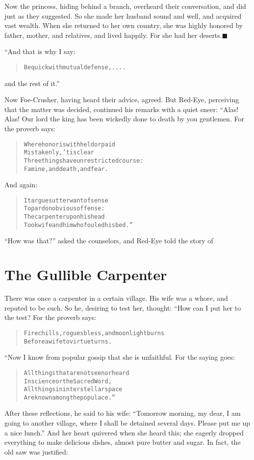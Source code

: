 \documentclass[article, twoside, 14pt]{memoir}
\newcommand{\qed}{\hfill \ensuremath{\blacksquare}}
\renewenvironment{verbatim}{%
\begin{quote}%
\vskip -10pt%
\begin{alltt}\normalfont\large}{\end{alltt}%
\end{quote}%
\vskip -10pt
} %
\begin{document}
Now the princess, hiding behind a branch, overheard their
conversation, and did just as they suggested. So she made her
husband sound and well, and acquired vast wealth. When she returned
to her own country, she was highly honored by father, mother, and
relatives, and lived happily. For she had her
deserts.\hyperref[s58]{\qed}

“And that is why I say:

\begin{verbatim}
Be quick with mutual defense, ....
\end{verbatim}
and the rest of it.”

Now Foe-Crusher, having heard their advice, agreed. But Red-Eye,
perceiving that the matter was decided, continued his remarks with
a quiet sneer: “Alas! Alas! Our lord the king has been wickedly
done to death by you gentlemen. For the proverb says:

\begin{verbatim}
Where honor is withheld or paid
    Mistakenly, 'tis clear
Three things have unrestricted course:
    Famine, and death, and fear.
\end{verbatim}
And again:

\begin{verbatim}
It argues utter want of sense
To pardon obvious offense:
The carpenter upon his head
Took wife and him who fouled his bed.”
\end{verbatim}
``How was that?'' asked the counselors, and Red-Eye told the story
of

\chapter{The Gullible Carpenter}

\label{s59}

There was once a carpenter in a certain village. His wife was
a whore, and reputed to be such. So he, desiring to test her,
thought: “How can I put her to the test? For the proverb says:

\begin{verbatim}
Fire chills, rogues bless, and moonlight burns
Before a wife to virtue turns.
\end{verbatim}
“Now I know from popular gossip that she is unfaithful. For the
saying goes:

\begin{verbatim}
All things that are not seen or heard
In science or the Sacred Word,
All things in interstellar space
Are known among the populace.”
\end{verbatim}
After these reflections, he said to his wife:
``Tomorrow morning, my dear, I am going to another village, where I shall be detained several days. Please put me up a nice lunch.''
And her heart quivered when she heard this; she eagerly dropped
everything to make delicious dishes, almost pure butter and sugar.
In fact, the old saw was justified:
\end{document}
